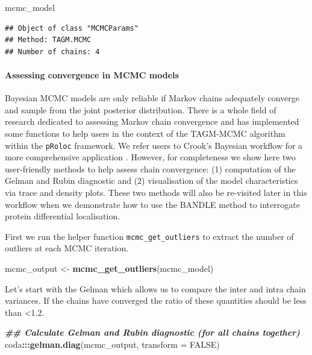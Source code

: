 \documentclass[9pt,a4paper,]{extarticle}
\newenvironment{Shaded}{\begin{snugshade}}{\end{snugshade}}
\newcommand{\AttributeTok}[1]{\textcolor[rgb]{0.13,0.29,0.53}{#1}}
\newcommand{\ConstantTok}[1]{\textcolor[rgb]{0.56,0.35,0.01}{#1}}
\newcommand{\DocumentationTok}[1]{\textcolor[rgb]{0.56,0.35,0.01}{\textbf{\textit{#1}}}}
\newcommand{\FunctionTok}[1]{\textcolor[rgb]{0.13,0.29,0.53}{\textbf{#1}}}
\newcommand{\NormalTok}[1]{#1}
\newcommand{\OtherTok}[1]{\textcolor[rgb]{0.56,0.35,0.01}{#1}}
\newcommand{\SpecialCharTok}[1]{\textcolor[rgb]{0.81,0.36,0.00}{\textbf{#1}}}
\begin{document}
\begin{Shaded}
\begin{Highlighting}[]
\NormalTok{mcmc\_model}
\end{Highlighting}
\end{Shaded}

\begin{verbatim}
## Object of class "MCMCParams"
## Method: TAGM.MCMC 
## Number of chains: 4
\end{verbatim}

\paragraph{Assessing convergence in MCMC models}\label{assessing-convergence-in-mcmc-models}

Bayesian MCMC models are only reliable if Markov chains adequately converge and
sample from the joint posterior distribution. There is a whole field of research
dedicated to assessing Markov chain convergence and \citet{Crook2019} has implemented
some functions to help users in the context of the TAGM-MCMC algorithm within
the \texttt{pRoloc} framework. We refer users to Crook's Bayesian workflow
for a more comprehensive application \citep{Crook2019}. However, for completeness we
show here two user-friendly methods to help assess chain convergence: (1)
computation of the Gelman and Rubin diagnostic and (2) visualisation of the
model characteristics via trace and density plots. These two methods will also
be re-visited later in this workflow when we demonstrate how to use the BANDLE
method to interrogate protein differential localisation.

First we run the helper function \texttt{mcmc\_get\_outliers} to extract the number of
outliers at each MCMC iteration.

\begin{Shaded}
\begin{Highlighting}[]
\NormalTok{mcmc\_output }\OtherTok{\textless{}{-}} \FunctionTok{mcmc\_get\_outliers}\NormalTok{(mcmc\_model)}
\end{Highlighting}
\end{Shaded}

Let's start with the Gelman which allows us to compare the inter and intra chain
variances. If the chains have converged the ratio of these quantities should be
less than \textless1.2.

\begin{Shaded}
\begin{Highlighting}[]
\DocumentationTok{\#\# Calculate Gelman and Rubin diagnostic (for all chains together)}
\NormalTok{coda}\SpecialCharTok{:::}\FunctionTok{gelman.diag}\NormalTok{(mcmc\_output, }\AttributeTok{transform =} \ConstantTok{FALSE}\NormalTok{)}
\end{Highlighting}
\end{Shaded}
\end{document}
